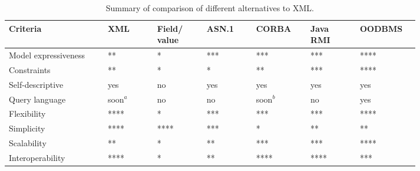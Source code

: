\begin{table}[h!]
    \centering
    \begin{tabular}{|m{0.20\linewidth}|m{0.10\linewidth}|m{0.10\linewidth}|m{0.10\linewidth}|m{0.11\linewidth}|m{0.10\linewidth}|m{0.10\linewidth}|}
        \hline

        \textbf{Criteria}                      & \textbf{XML}        & \textbf{{\small Field/ value} }        & \textbf{{\small ASN.1}}    & \textbf{{\small CORBA}} &\textbf{{\small Java RMI}}      & \textbf{{\small OODBMS}}      \\

        \hline
        Model expressiveness 	& **	& *		& *** & *** & *** & ****     \\
        
        \hline
        Constraints	    & **	& *	& *    & **   & ***   & ****       \\
        
        \hline
        Self-descriptive    & yes	& no	& yes    & yes   &  yes  &  yes      \\
        
        \hline
        Query language	 & soon$^a$ 	& no	& no    & soon$^b$    & no   &  yes \\
        
        \hline
        Flexibility	 & ****	& *	& ***    &  ***  & ***   & ****  \\
        
        \hline
        Simplicity 	 & ****	& ****	& ***    & *   & **   & **  \\
        
        \hline
        Scalability 	 & **	& *	& **   & ***   & ***   & ****  \\
        
        \hline
        Interoperability 	 & ****	& *	&  **  & ****   & ****   & ***  \\
                
        \hline
    \end{tabular} 

    \caption{Summary of comparison of different alternatives to XML.}
    \label{tab:xmlcomparaison}
\end{table}
